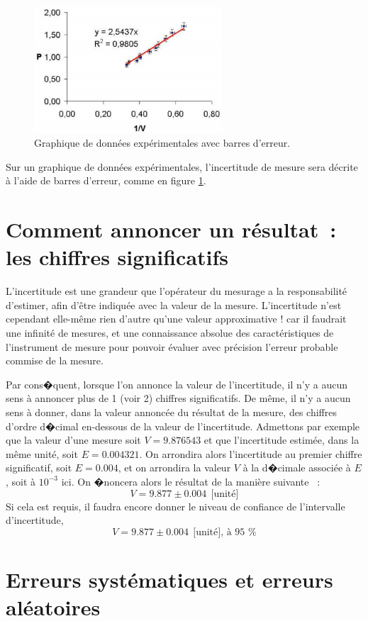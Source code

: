 \begin{figure}
   \centering
   \includegraphics[width=7cm]{assets/figures/errbar.pdf}
   \caption{Graphique de données expérimentales avec barres d'erreur.}
   \label{fig:errbar}
\end{figure}
Sur un graphique de données expérimentales, l'incertitude de mesure sera décrite à l'aide de barres d'erreur, comme en figure \ref{fig:errbar}.

\section{Comment annoncer un résultat~: les chiffres significatifs}

L'incertitude est une grandeur que l'opérateur du mesurage a la responsabilité d'estimer, afin d'être indiquée avec la valeur de la mesure. L'incertitude n'est cependant elle-même rien d'autre qu'une valeur approximative ! car il faudrait une infinité de mesures, et une connaissance absolue des caractéristiques de l'instrument de mesure pour pouvoir évaluer avec précision l'erreur probable commise de la mesure.

Par cons�quent, lorsque l'on annonce la valeur de l'incertitude, il n'y a aucun sens à annoncer plus de 1 (voir 2) chiffres significatifs. De même, il n'y a aucun sens à donner, dans la valeur annoncée du résultat de la mesure, des chiffres d'ordre d�cimal en-dessous de la valeur de l'incertitude. Admettons par exemple que la valeur d'une mesure soit $V=9.876543$ et que l'incertitude estimée, dans la même unité, soit $E=0.004321$. On arrondira alors l'incertitude au premier chiffre significatif, soit $E=0.004$, et on arrondira la valeur $V$ à la d�cimale associée à $E$, soit à $10^{-3}$ ici. On �noncera alors le résultat de la manière suivante ~:
$$
V=9.877\pm0.004\ \ \text{[unité]}
$$
Si cela est requis, il faudra encore donner le niveau de confiance de l'intervalle d'incertitude,
$$
V=9.877\pm0.004\ \ \text{[unité], à 95 \%}
$$

\section{Erreurs systématiques et erreurs aléatoires}

